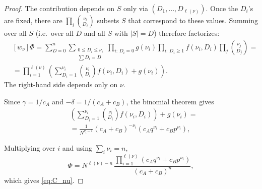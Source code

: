 \documentclass{article}
\theoremstyle{plain}
\theoremstyle{definition}
\numberwithin{equation}{section}
\begin{document}
\begin{proof}
    The contribution depends on $S$ only via $(D_1,\dots,D_{\ell(\nu)})$. Once the $D_i$'s are fixed, there are $\prod_i\binom{\nu_i}{D_i}$ subsets $S$ that correspond to these values. Summing over all $S$ (i.e.\ over all $D$ and all $S$ with $|S|=D$) therefore factorizes:
    \begin{equation}
        \begin{aligned}
            & [w_\nu]\Phi= \sum_{D=0}^n \sum_{\substack{0 \le D_i \le \nu_i \\ \sum D_i = D}} \prod_{i:\,D_i=0} g(\nu_i)\prod_{i:\,D_i\ge1} f(\nu_i,D_i)  \prod_j\binom{\nu_j}{D_j}=\\
            & = \prod_{i=1}^{\ell(\nu)}\left(\sum_{D_i=1}^{\nu_i}\binom{\nu_i}{D_i}f(\nu_i,D_i)+g(\nu_i)\right).
        \end{aligned}
    \end{equation}
    The right-hand side depends only on $\nu$.

    Since $\gamma=1/c_A$ and $-\delta=1/(c_A+c_B)$, the binomial theorem gives
    \begin{equation}
        \label{eq:ith_factor_expression}
        \begin{aligned}
            & \left(\sum\limits_{D_i=1}^{\nu_i} \binom{\nu_{i}}{D_{i}} f(\nu_{i}, D_{i})\right) + g(\nu_i) = \\
            & = \frac{1}{N^{\nu_i-1}}(c_A+c_B)^{-\nu_i}(c_A q^{\nu_i} + c_B p^{\nu_i}),
        \end{aligned}
    \end{equation}

    
    Multiplying over $i$ and using $\sum_i\nu_i=n$,
    \begin{equation}
        [w_\nu]\Phi=N^{\ell(\nu)-n}\,\frac{\prod_{i=1}^{\ell(\nu)}(c_Aq^{\nu_i}+c_Bp^{\nu_i})}{(c_A+c_B)^n},
    \end{equation}
    which gives \eqref{eq:C_nu}.
\end{proof}
\end{document}
